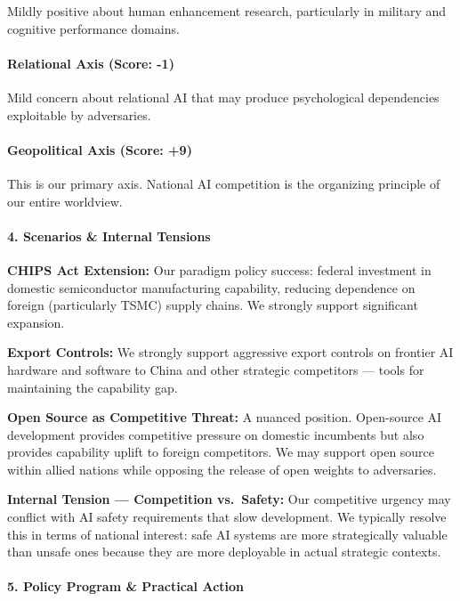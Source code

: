 Mildly positive about human enhancement research, particularly in
military and cognitive performance domains.

\paragraph{Relational Axis (Score:
-1)}\label{relational-axis-score--1-1}

Mild concern about relational AI that may produce psychological
dependencies exploitable by adversaries.

\paragraph{Geopolitical Axis (Score:
+9)}\label{geopolitical-axis-score-9}

This is our primary axis. National AI competition is the organizing
principle of our entire worldview.

\paragraph{4. Scenarios \& Internal
Tensions}\label{scenarios-internal-tensions-19}

\textbf{CHIPS Act Extension:} Our paradigm policy success: federal
investment in domestic semiconductor manufacturing capability, reducing
dependence on foreign (particularly TSMC) supply chains. We strongly
support significant expansion.

\textbf{Export Controls:} We strongly support aggressive export controls
on frontier AI hardware and software to China and other strategic
competitors --- tools for maintaining the capability gap.

\textbf{Open Source as Competitive Threat:} A nuanced position.
Open-source AI development provides competitive pressure on domestic
incumbents but also provides capability uplift to foreign competitors.
We may support open source within allied nations while opposing the
release of open weights to adversaries.

\textbf{Internal Tension --- Competition vs.~Safety:} Our competitive
urgency may conflict with AI safety requirements that slow development.
We typically resolve this in terms of national interest: safe AI systems
are more strategically valuable than unsafe ones because they are more
deployable in actual strategic contexts.

\paragraph{5. Policy Program \& Practical
Action}\label{policy-program-practical-action-19}

